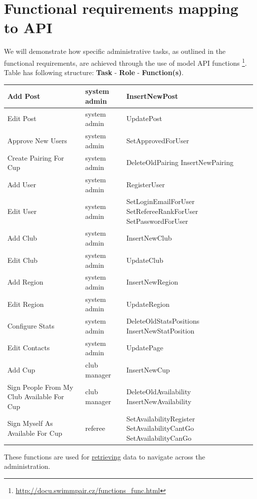 \section {Functional requirements mapping to API}
We will demonstrate how specific administrative tasks, as outlined in the functional requirements, are achieved through the use of model API functions \footnote{\url{http://docu.swimmpair.cz/functions_func.html}}.
\newline
Table has following structure: \textbf{Task} - \textbf{Role} - \textbf{Function(s)}.
\newline
\begin{tabularx}{1.0\textwidth} { 
  | >{\raggedright\arraybackslash}X 
  | >{\centering\arraybackslash}X 
  | >{\raggedright\arraybackslash}X | }
 \hline
 Add Post & system admin& InsertNewPost \\
 \hline
 Edit Post  & system admin  & UpdatePost \\
 \hline
 Approve New Users & system admin & SetApprovedForUser \\
 \hline
 Create Pairing For Cup & system admin & DeleteOldPairing
InsertNewPairing\\
 \hline
 Add User & system admin & RegisterUser \\
 \hline
 Edit User & system admin &
 SetLoginEmailForUser
 SetRefereeRankForUser
 SetPasswordForUser\\
 \hline
 Add Club & system admin & InsertNewClub \\
 \hline
 Edit Club & system admin & UpdateClub \\
 \hline
 Add Region & system admin & InsertNewRegion \\
 \hline
 Edit Region & system admin & UpdateRegion \\
 \hline
 Configure Stats & system admin & DeleteOldStatsPositions
 InsertNewStatPosition \\
 \hline
 Edit Contacts & system admin & UpdatePage \\
 \hline
 Add Cup & club manager & InsertNewCup \\
 \hline
 Sign People From My Club Available For Cup & club manager & DeleteOldAvailability
 InsertNewAvailability \\
 \hline
 Sign Myself As Available For Cup & referee & SetAvailabilityRegister
 SetAvailabilityCantGo 
 SetAvailabilityCanGo \\
\hline
\end{tabularx}
\iffalse
These functions are used for \underline{retrieving} data to navigate across the administration.
